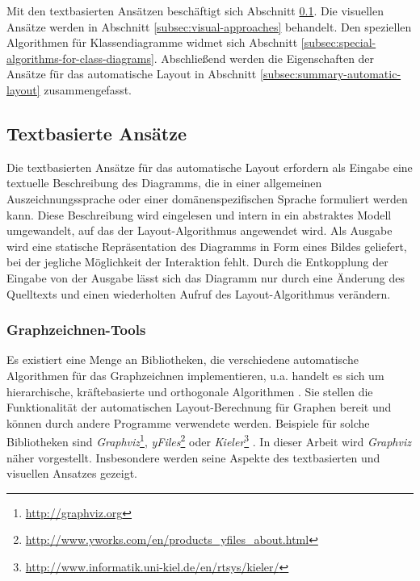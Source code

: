 Mit den textbasierten Ansätzen beschäftigt sich Abschnitt \ref{subsec:text-based-approaches}. Die visuellen Ansätze werden in Abschnitt \ref{subsec:visual-approaches} behandelt. Den speziellen Algorithmen für Klassendiagramme widmet sich Abschnitt \ref{subsec:special-algorithms-for-class-diagrams}. Abschließend werden die Eigenschaften der Ansätze für das automatische Layout in Abschnitt \ref{subsec:summary-automatic-layout} zusammengefasst.

\subsection{Textbasierte Ansätze}
\label{subsec:text-based-approaches}

Die textbasierten Ansätze für das automatische Layout erfordern als Eingabe eine textuelle Beschreibung des Diagramms, die in einer allgemeinen Auszeichnungssprache oder einer domänenspezifischen Sprache formuliert werden kann. Diese Beschreibung wird eingelesen und intern in ein abstraktes Modell umgewandelt, auf das der Layout-Algorithmus angewendet wird. Als Ausgabe wird eine statische Repräsentation des Diagramms in Form eines Bildes geliefert, bei der jegliche Möglichkeit der Interaktion fehlt. Durch die Entkopplung der Eingabe von der Ausgabe lässt sich das Diagramm nur durch eine Änderung des Quelltexts und einen wiederholten Aufruf des Layout-Algorithmus verändern.

\subsubsection{Graphzeichnen-Tools}
\label{subsubsec:graph-drawing-tools}

Es existiert eine Menge an Bibliotheken, die verschiedene automatische Algorithmen für das Graphzeichnen implementieren, u.a. handelt es sich um hierarchische, kräftebasierte und orthogonale Algorithmen \cite{Maier12A-Pattern-based}. Sie stellen die Funktionalität der automatischen Layout-Be\-rech\-nung für Graphen bereit und können durch andere Programme verwendete werden.  Beispiele für solche Bibliotheken sind \textit{Graphviz}\footnote{\url{http://graphviz.org}}, \textit{yFiles}\footnote{\url{http://www.yworks.com/en/products_yfiles_about.html}} oder \textit{Kieler}\footnote{\url{http://www.informatik.uni-kiel.de/en/rtsys/kieler/}} \cite{Maier12A-Pattern-based}. In dieser Arbeit wird \textit{Graphviz} näher vorgestellt. Insbesondere werden seine Aspekte des textbasierten und visuellen Ansatzes gezeigt.

